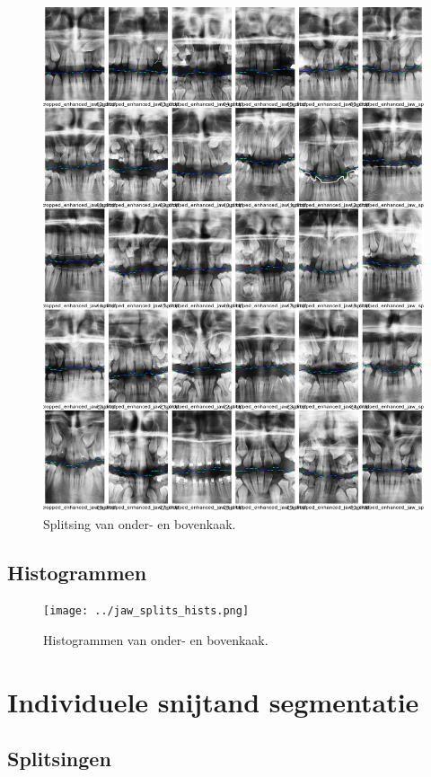 \documentclass[10pt,a4paper]{article}
\begin{document}
\begin{figure}[H]
\centering
\includegraphics[width=.9\linewidth]{../jaw_splits.png}
\caption{Splitsing van onder- en bovenkaak.}
\label{fig:jaw-splits}
\end{figure}

\subsection*{Histogrammen}

\begin{figure}[H]
\centering
\texttt{[image: ../jaw\_splits\_hists.png]}
\caption{Histogrammen van onder- en bovenkaak.}
\label{fig:jaw-splits-hists}
\end{figure}


\section*{Individuele snijtand segmentatie}
\label{appendix:teeth-segmentation}

\subsection*{Splitsingen}
\label{appendix:teeth-isolation}
\end{document}
